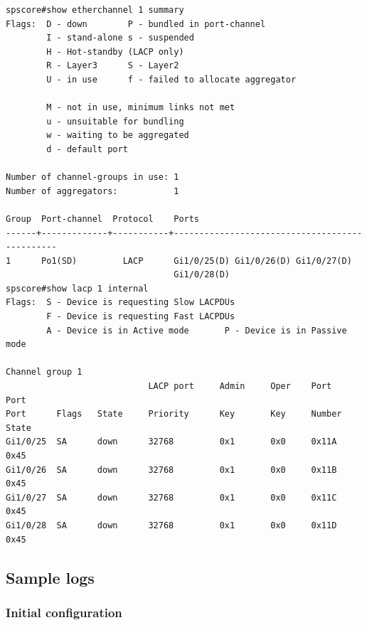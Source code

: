 \documentclass[a4paper,notitlepage]{article}
\begin{document}
\begin{verbatim}
spscore#show etherchannel 1 summary 
Flags:  D - down        P - bundled in port-channel
        I - stand-alone s - suspended
        H - Hot-standby (LACP only)
        R - Layer3      S - Layer2
        U - in use      f - failed to allocate aggregator

        M - not in use, minimum links not met
        u - unsuitable for bundling
        w - waiting to be aggregated
        d - default port

Number of channel-groups in use: 1
Number of aggregators:           1

Group  Port-channel  Protocol    Ports
------+-------------+-----------+-----------------------------------------------
1      Po1(SD)         LACP      Gi1/0/25(D) Gi1/0/26(D) Gi1/0/27(D) 
                                 Gi1/0/28(D) 
spscore#show lacp 1 internal 
Flags:  S - Device is requesting Slow LACPDUs 
        F - Device is requesting Fast LACPDUs
        A - Device is in Active mode       P - Device is in Passive mode     

Channel group 1
                            LACP port     Admin     Oper    Port        Port
Port      Flags   State     Priority      Key       Key     Number      State
Gi1/0/25  SA      down      32768         0x1       0x0     0x11A       0x45  
Gi1/0/26  SA      down      32768         0x1       0x0     0x11B       0x45  
Gi1/0/27  SA      down      32768         0x1       0x0     0x11C       0x45  
Gi1/0/28  SA      down      32768         0x1       0x0     0x11D       0x45  
\end{verbatim}


\subsection{Sample logs}

\subsubsection{Initial configuration}
\end{document}
